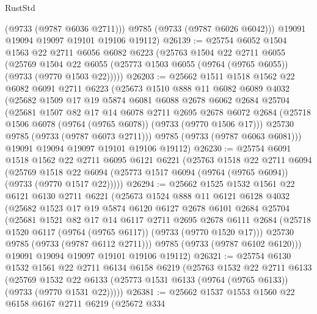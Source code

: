 \begin{lexlean}{RustStd}
\begin{coremodule}
          (@9733 (@9787 @6036 @2711)))
        @9785
        (@9733 (@9787 @6026 @6042)))
      @19091
      @19094
      @19097
      @19101
      @19106
      @19112)
@26139 := @25754
    @6052
    @1504
    @1563
    @22
    @2711
    @6056
    @6082
    @6223
    (@25763
      @1504
      @22
      @2711
      @6055
      (@25769 @1504 @22 @6055 (@25773 @1503 @6055 (@9764 (@9765 @6055)) (@9733 (@9770 @1503 @22)))))
@26203 := @25662
    @1511
    @1518
    @1562
    @22
    @6082
    @6091
    @2711
    @6223
    (@25673
      @1510
      @888
      @11
      @6082
      @6089
      @4032
      (@25682
        @1509
        @17
        @19
        @5874
        @6081
        @6088
        @2678
        @6062
        @2684
        @25704
        (@25681
          @1507
          @82
          @17
          @14
          @6078
          @2711
          @2695
          @2678
          @6072
          @2684
          (@25718 @1506 @6078 (@9764 (@9765 @6078)) (@9733 (@9770 @1506 @17)))
          @25730
          @9785
          (@9733 (@9787 @6073 @2711)))
        @9785
        (@9733 (@9787 @6063 @6081)))
      @19091
      @19094
      @19097
      @19101
      @19106
      @19112)
@26230 := @25754
    @6091
    @1518
    @1562
    @22
    @2711
    @6095
    @6121
    @6221
    (@25763
      @1518
      @22
      @2711
      @6094
      (@25769 @1518 @22 @6094 (@25773 @1517 @6094 (@9764 (@9765 @6094)) (@9733 (@9770 @1517 @22)))))
@26294 := @25662
    @1525
    @1532
    @1561
    @22
    @6121
    @6130
    @2711
    @6221
    (@25673
      @1524
      @888
      @11
      @6121
      @6128
      @4032
      (@25682
        @1523
        @17
        @19
        @5874
        @6120
        @6127
        @2678
        @6101
        @2684
        @25704
        (@25681
          @1521
          @82
          @17
          @14
          @6117
          @2711
          @2695
          @2678
          @6111
          @2684
          (@25718 @1520 @6117 (@9764 (@9765 @6117)) (@9733 (@9770 @1520 @17)))
          @25730
          @9785
          (@9733 (@9787 @6112 @2711)))
        @9785
        (@9733 (@9787 @6102 @6120)))
      @19091
      @19094
      @19097
      @19101
      @19106
      @19112)
@26321 := @25754
    @6130
    @1532
    @1561
    @22
    @2711
    @6134
    @6158
    @6219
    (@25763
      @1532
      @22
      @2711
      @6133
      (@25769 @1532 @22 @6133 (@25773 @1531 @6133 (@9764 (@9765 @6133)) (@9733 (@9770 @1531 @22)))))
@26381 := @25662
    @1537
    @1553
    @1560
    @22
    @6158
    @6167
    @2711
    @6219
    (@25672
      @334

\end{coremodule}
\end{lexlean}
